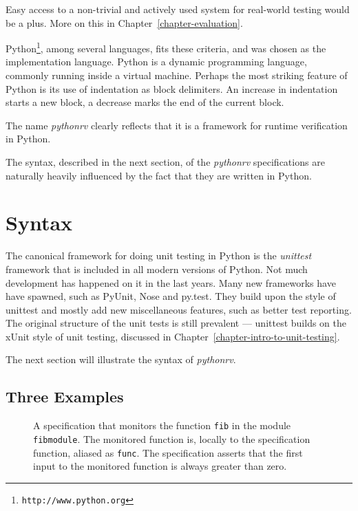 \documentclass[a4paper,11pt]{kth-mag}
\begin{document}
Easy access to a non-trivial and actively used system for real-world testing
would be a plus. More on this in Chapter~\ref{chapter-evaluation}.

Python\footnote{\texttt{http://www.python.org}}, among several languages, fits
these criteria, and was chosen as the implementation language. Python is a
dynamic programming language, commonly running inside a virtual machine.
Perhaps the most striking feature of Python is its use of indentation as block
delimiters. An increase in indentation starts a new block, a decrease marks the
end of the current block.

The name \textit{pythonrv} clearly reflects that it is a framework for runtime
verification in Python.

The syntax, described in the next section, of the \textit{pythonrv}
specifications are naturally heavily influenced by the fact that they are
written in Python.


\section{Syntax} \label{section-approach-syntax}

The canonical framework for doing unit testing in Python is the
\textit{unittest} framework that is included in all modern versions of Python.
Not much development has happened on it in the last years. Many new frameworks
have have spawned, such as PyUnit, Nose and py.test. They build upon the style
of unittest and mostly add new miscellaneous features, such as better test
reporting. The original structure of the unit tests is still prevalent ---
unittest builds on the xUnit style of unit testing, discussed in
Chapter~\ref{chapter-intro-to-unit-testing}.

The next section will illustrate the syntax of \textit{pythonrv}.


\subsection{Three Examples}
\lstset{language=Python,numbers=left}

\begin{figure}[h!]
	\begin{center}
	\begin{minipage}{0.7\textwidth}
	
	\end{minipage}
	\end{center}

	\caption{A specification that monitors the function \texttt{fib} in the
	module \texttt{fibmodule}. The monitored function is, locally to the
specification function, aliased as \texttt{func}. The specification asserts
that the first input to the monitored function is always greater than zero.}
	\label{figure-syntax-example-1}
\end{figure}
\end{document}
